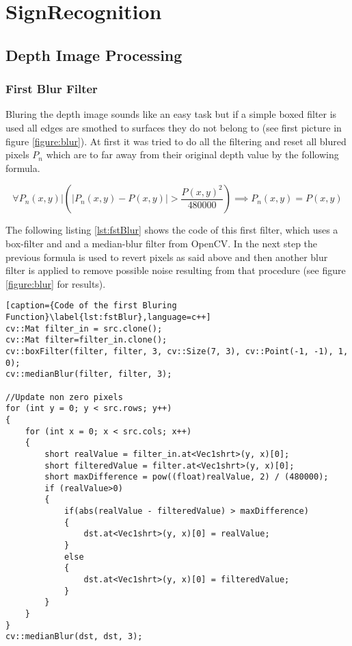 \chapter{SignRecognition}
\graphicspath{{./Software/img/}}
 
\section{Depth Image Processing}

\subsection{First Blur Filter}
Bluring the depth image sounds like an easy task but if a simple boxed filter is used all edges are smothed to surfaces
they do not belong to (see first picture in figure \vref{figure:blur}).
At first it was tried to do all the filtering and reset all blured pixels $P_n$ which are to far away from their 
original depth value by the following formula.

\[
 \forall P_n(x,y)  |   \left(\left|{P_n(x,y)-P(x,y)}\right|>{\frac{P(x,y)^2}{480000}}\right)\implies P_n(x,y)=P(x,y)
\]

The following listing \vref{lst:fstBlur} shows the code of this first filter, which uses a box-filter and and a 
median-blur filter from OpenCV. In the next step the previous formula is used to revert pixels as said above and 
then another blur filter is applied to remove possible noise resulting from that procedure 
(see figure \vref{figure:blur} for results).

\newpage

\begin{lstlisting}[caption={Code of the first Bluring Function}\label{lst:fstBlur},language=c++]  
cv::Mat filter_in = src.clone();
cv::Mat filter=filter_in.clone();
cv::boxFilter(filter, filter, 3, cv::Size(7, 3), cv::Point(-1, -1), 1, 0);
cv::medianBlur(filter, filter, 3);

//Update non zero pixels
for (int y = 0; y < src.rows; y++)
{
	for (int x = 0; x < src.cols; x++)
	{
		short realValue = filter_in.at<Vec1shrt>(y, x)[0];
		short filteredValue = filter.at<Vec1shrt>(y, x)[0];
		short maxDifference = pow((float)realValue, 2) / (480000);
		if (realValue>0)
		{
			if(abs(realValue - filteredValue) > maxDifference)
			{
				dst.at<Vec1shrt>(y, x)[0] = realValue;
			}
			else
			{
				dst.at<Vec1shrt>(y, x)[0] = filteredValue;
			}
		}
	}
}
cv::medianBlur(dst, dst, 3);
\end{lstlisting}

